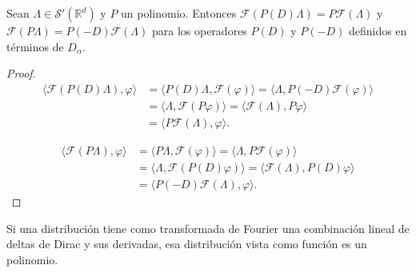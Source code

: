 \begin{teorema}\label{thm:d01}
Sean $\Lambda\in \mathcal{S}'(\mathds{R}^{d})$ y $P$ un polinomio. Entonces $\mathcal{F}(P(D)\Lambda )= P\mathcal{F}(\Lambda)$ y $\mathcal{F}(P\Lambda)= P (-D) \mathcal{F}(\Lambda)$ para los operadores $P(D)$ y $P(-D)$ definidos en términos de $D_{\alpha}$.
\end{teorema}
\begin{proof}
\begin{align}
\langle \mathcal{F}(P(D)\Lambda), \varphi \rangle & = \langle P(D)\Lambda, \mathcal{F}(\varphi)\rangle = \langle \Lambda, P(-D)\mathcal{F}(\varphi) \rangle \\
 & = \langle \Lambda, \mathcal{F}(P\varphi) \rangle = \langle \mathcal{F}(\Lambda), P\varphi \rangle \\ & = \langle P\mathcal{F}(\Lambda),\varphi \rangle.
\end{align}

\begin{align}
\langle \mathcal{F}(P\Lambda), \varphi \rangle & = \langle P\Lambda, \mathcal{F}(\varphi)\rangle = \langle \Lambda, P \mathcal{F}(\varphi)\rangle \\
 & = \langle \Lambda, \mathcal{F}(P(D)\varphi) \rangle = \langle \mathcal{F}(\Lambda), P(D)\varphi \rangle \\ & = \langle P(-D)\mathcal{F}(\Lambda),\varphi \rangle.
\end{align}


\end{proof}
\begin{lema}\label{lm:d02}
Si una distribución tiene como transformada de Fourier una combinación lineal de deltas de Dirac y sus derivadas, esa distribución vista como función es un polinomio. 
\end{lema}
